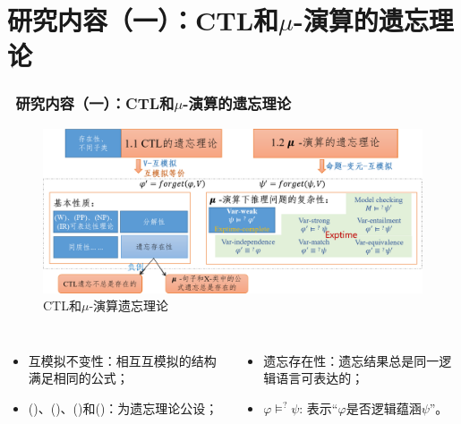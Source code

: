 \documentclass[9pt, CJK]{beamer}
\begin{document}
\section{研究内容（一）：CTL和$\mu$-演算的遗忘理论}
\begin{frame}  
	\frametitle{~研究内容（一）：CTL和$\mu$-演算的遗忘理论}
	\begin{figure}
		\includegraphics[scale=0.35]{figures/ctlMuForgFrame1}
		\caption{CTL和$\mu$-演算遗忘理论}
	\end{figure}
	{\tiny 
		\begin{columns}
			\begin{itemize} 
				\item 互模拟不变性：相互互模拟的结构满足相同的公式；
				\item (\W)、(\PP)、(\NgP)和(\IR)：为遗忘理论公设；
			\end{itemize}
			\begin{itemize}
				\item 遗忘存在性：遗忘结果总是同一逻辑语言可表达的；
				\item $\varphi \models^? \psi$: 表示“$\varphi$是否逻辑蕴涵$\psi$”。
			\end{itemize}
		\end{columns}
	}

\end{frame}
\end{document}
